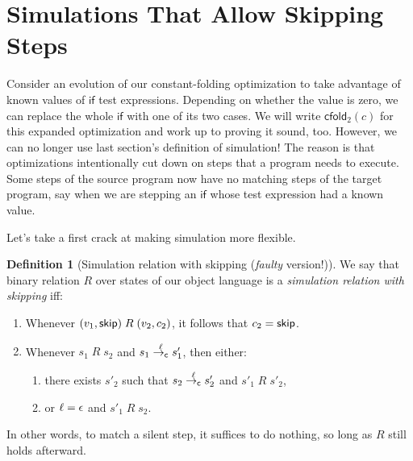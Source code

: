 \documentclass{amsbook}
\theoremstyle{definition}
\newtheorem{definition}[theorem]{Definition}
\theoremstyle{remark}
\numberwithin{section}{chapter}
\numberwithin{equation}{chapter}
\begin{document}
\section{Simulations That Allow Skipping Steps}

\newcommand{\cfoldt}[1]{\mathsf{cfold}_2(#1)}

Consider an evolution of our constant-folding optimization to take advantage of known values of $\mathsf{if}$ test expressions.
Depending on whether the value is zero, we can replace the whole $\mathsf{if}$ with one of its two cases.
We will write $\cfoldt{c}$ for this expanded optimization and work up to proving it sound, too.
However, we can no longer use last section's definition of simulation!
The reason is that optimizations intentionally cut down on steps that a program needs to execute.
Some steps of the source program now have no matching steps of the target program, say when we are stepping an $\mathsf{if}$ whose test expression had a known value.

Let's take a first crack at making simulation more flexible.

\begin{definition}[Simulation relation with skipping (\emph{faulty} version!)]
  We say that binary relation $R$ over states of our object language is a \emph{simulation relation with skipping} iff:
  \begin{enumerate}
    \item Whenever $(v_1, \mathsf{skip}) \; R \; (v_2, c_2)$, it follows that $c_2 = \mathsf{skip}$.
    \item Whenever $s_1 \; R \; s_2$ and $s_1 \stackrel{\ell}{\to_\mathsf{c}} s'_1$, then either:
      \begin{enumerate}
        \item there exists $s'_2$ such that $s_2 \stackrel{\ell}{\to_\mathsf{c}} s'_2$ and $s'_1 \; R \; s'_2$,
        \item or $\ell = \epsilon$ and $s'_1 \; R \; s_2$.
      \end{enumerate}
  \end{enumerate}
\end{definition}

In other words, to match a silent step, it suffices to do nothing, so long as $R$ still holds afterward.

\newcommand{\addad}[1]{\mathsf{withAds}(#1)}
\end{document}
